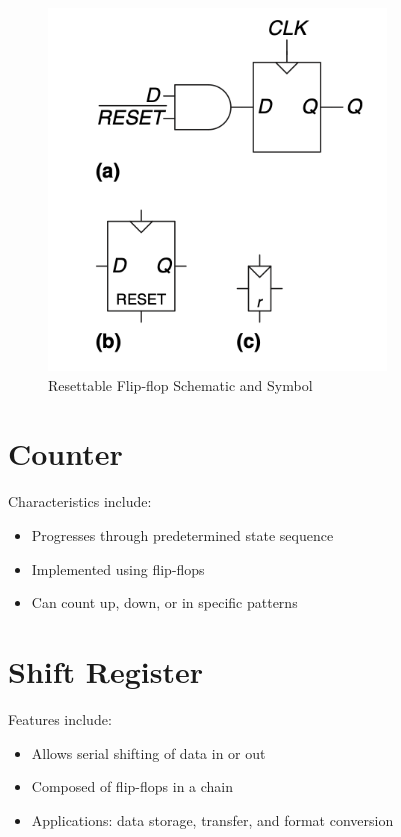 \documentclass[12pt]{report}
\begin{document}
\begin{figure}[H]
    \centering
    \includegraphics[width=0.8\textwidth]{Resettable_flip_flop_schematic_and_symbol.png}
    \caption{Resettable Flip-flop Schematic and Symbol}
\end{figure}

\section{Counter}
 Characteristics include:
\begin{itemize}
    \item Progresses through predetermined state sequence
    \item Implemented using flip-flops
    \item Can count up, down, or in specific patterns
\end{itemize}

\section{Shift Register}
 Features include:
\begin{itemize}
    \item Allows serial shifting of data in or out
    \item Composed of flip-flops in a chain
    \item Applications: data storage, transfer, and format conversion
\end{itemize}
\end{document}
